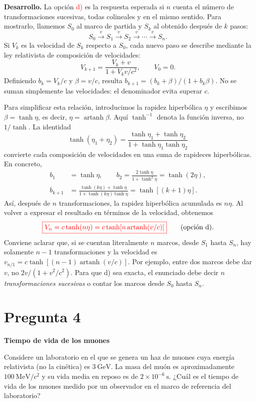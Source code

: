 \documentclass[a4paper,11pt]{article}
\newcommand{\pregunta}[2]{\section*{Pregunta #1}\textbf{#2}\par}
\begin{document}
\textbf{Desarrollo.} La opción \textcolor{red}{d)} es la respuesta esperada si $n$ cuenta el número de transformaciones sucesivas, todas colineales y en el mismo sentido. Para mostrarlo, llamemos $S_0$ al marco de partida y $S_k$ al obtenido después de $k$ pasos:
\[
S_0\xrightarrow{\ v\ }S_1\xrightarrow{\ v\ }S_2
\xrightarrow{\ v\ }\cdots\xrightarrow{\ v\ }S_n.
\]
Si $V_k$ es la velocidad de $S_k$ respecto a $S_0$, cada nuevo paso se describe mediante la ley relativista de composición de velocidades:
\[
V_{k+1}=\frac{V_k+v}{1+V_kv/c^2},\qquad V_0=0.
\]
Definiendo $b_k=V_k/c$ y $\beta=v/c$, resulta $b_{k+1}=(b_k+\beta)/(1+b_k\beta)$. No se suman simplemente las velocidades: el denominador evita superar $c$.

Para simplificar esta relación, introducimos la rapidez hiperbólica $\eta$ y escribimos $\beta=\tanh\eta$, es decir, $\eta=\operatorname{artanh}\beta$. Aquí $\tanh^{-1}$ denota la función inversa, no $1/\tanh$. La identidad
\[
\tanh(\eta_1+\eta_2)
=\frac{\tanh\eta_1+\tanh\eta_2}{1+\tanh\eta_1\tanh\eta_2}
\]
convierte cada composición de velocidades en una suma de rapideces hiperbólicas. En concreto,
\[
\begin{aligned}
b_1&=\tanh\eta,\qquad b_2=\frac{2\tanh\eta}{1+\tanh^2\eta}=\tanh(2\eta),\\
b_{k+1}&=\frac{\tanh(k\eta)+\tanh\eta}{1+\tanh(k\eta)\tanh\eta}
=\tanh[(k+1)\eta].
\end{aligned}
\]
Así, después de $n$ transformaciones, la rapidez hiperbólica acumulada es $n\eta$. Al volver a expresar el resultado en términos de la velocidad, obtenemos
\[
\textcolor{red}{\boxed{V_n=c\tanh(n\eta)=c\tanh\!\left[n\operatorname{artanh}(v/c)\right]}}
\qquad\text{(opción d).}
\]
Conviene aclarar que, si se cuentan literalmente $n$ marcos, desde $S_1$ hasta $S_n$, hay solamente $n-1$ transformaciones y la velocidad es $v_{n/1}=c\tanh[(n-1)\operatorname{artanh}(v/c)]$. Por ejemplo, entre dos marcos debe dar $v$, no $2v/(1+v^2/c^2)$. Para que d) sea exacta, el enunciado debe decir \emph{$n$ transformaciones sucesivas} o contar los marcos desde $S_0$ hasta $S_n$.
\parencite[Secs. 2.4.4--2.4.5, pp. 61--65]{chaparro2026}

\pregunta{4}{Tiempo de vida de los muones}

Considere un laboratorio en el que se genera un haz de muones cuya energía relativista (no la cinética) es $3\ \mathrm{GeV}$. La masa del muón es aproximadamente $100\ \mathrm{MeV}/c^2$ y su vida media en reposo es de $2\times10^{-6}\ \mathrm{s}$. ¿Cuál es el tiempo de vida de los muones medido por un observador en el marco de referencia del laboratorio?
\end{document}
